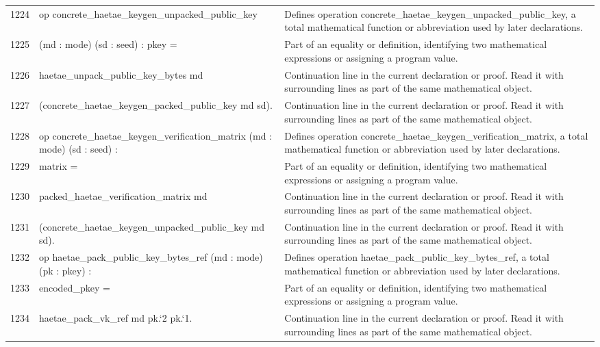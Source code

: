 \documentclass[10pt]{article}
\begin{document}
\begin{longtable}{r L{0.53\textwidth} L{0.37\textwidth}}
1224 & {\ttfamily\scriptsize op concrete\_haetae\_keygen\_unpacked\_public\_key} & Defines operation concrete\_haetae\_keygen\_unpacked\_public\_key, a total mathematical function or abbreviation used by later declarations. \\
1225 & {\ttfamily\scriptsize    (md : mode) (sd : seed) : pkey =} & Part of an equality or definition, identifying two mathematical expressions or assigning a program value. \\
1226 & {\ttfamily\scriptsize   haetae\_unpack\_public\_key\_bytes md} & Continuation line in the current declaration or proof.  Read it with surrounding lines as part of the same mathematical object. \\
1227 & {\ttfamily\scriptsize     (concrete\_haetae\_keygen\_packed\_public\_key md sd).} & Continuation line in the current declaration or proof.  Read it with surrounding lines as part of the same mathematical object. \\
1228 & {\ttfamily\scriptsize op concrete\_haetae\_keygen\_verification\_matrix (md : mode) (sd : seed) :} & Defines operation concrete\_haetae\_keygen\_verification\_matrix, a total mathematical function or abbreviation used by later declarations. \\
1229 & {\ttfamily\scriptsize   matrix =} & Part of an equality or definition, identifying two mathematical expressions or assigning a program value. \\
1230 & {\ttfamily\scriptsize   packed\_haetae\_verification\_matrix md} & Continuation line in the current declaration or proof.  Read it with surrounding lines as part of the same mathematical object. \\
1231 & {\ttfamily\scriptsize     (concrete\_haetae\_keygen\_unpacked\_public\_key md sd).} & Continuation line in the current declaration or proof.  Read it with surrounding lines as part of the same mathematical object. \\
1232 & {\ttfamily\scriptsize op haetae\_pack\_public\_key\_bytes\_ref (md : mode) (pk : pkey) :} & Defines operation haetae\_pack\_public\_key\_bytes\_ref, a total mathematical function or abbreviation used by later declarations. \\
1233 & {\ttfamily\scriptsize   encoded\_pkey =} & Part of an equality or definition, identifying two mathematical expressions or assigning a program value. \\
1234 & {\ttfamily\scriptsize   haetae\_pack\_vk\_ref md pk.`2 pk.`1.} & Continuation line in the current declaration or proof.  Read it with surrounding lines as part of the same mathematical object. \\

\end{longtable}
\end{document}
